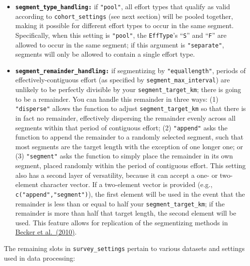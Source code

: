 \documentclass[
]{book}
\begin{document}
\begin{itemize}
\item
  \textbf{\texttt{segment\_type\_handling:}} if \texttt{"pool"}, all effort types that qualify as valid according to \texttt{cohort\_settings} (see next section) will be pooled together, making it possible for different effort types to occur in the same segment. Specifically, when this setting is \texttt{"pool"}, the \texttt{EffType}'s ``\texttt{S}'' and ``\texttt{F}'' are allowed to occur in the same segment; if this argument is \texttt{"separate"}, segments will only be allowed to contain a single effort type.
\item
  \textbf{\texttt{segment\_remainder\_handling:}} if segmentizing by \texttt{"equallength"}, periods of effectively-contiguous effort (as specified by \texttt{segment\_max\_interval}) are unlikely to be perfectly divisible by your \texttt{segment\_target\_km}; there is going to be a remainder. You can handle this remainder in three ways: (1) \texttt{"disperse"} allows the function to adjust \texttt{segment\_target\_km} so that there is in fact no remainder, effectively dispersing the remainder evenly across all segments within that period of contiguous effort; (2) \texttt{"append"} asks the function to append the remainder to a randomly selected segment, such that most segments are the target length with the exception of one longer one; or (3) \texttt{"segment"} asks the function to simply place the remainder in its own segment, placed randomly within the period of contiguous effort. This setting also has a second layer of versatility, because it can accept a one- or two-element character vector. If a two-element vector is provided (e.g., \texttt{c("append","segment")}), the first element will be used in the event that the remainder is less than or equal to half your \texttt{segment\_target\_km}; if the remainder is more than half that target length, the second element will be used. This feature allows for replication of the segmentizing methods in \href{https://www.int-res.com/abstracts/meps/v413/p163-183/}{Becker et al.~(2010)}.
\end{itemize}

The remaining slots in \texttt{survey\_settings} pertain to various datasets and settings used in data processing:
\end{document}
